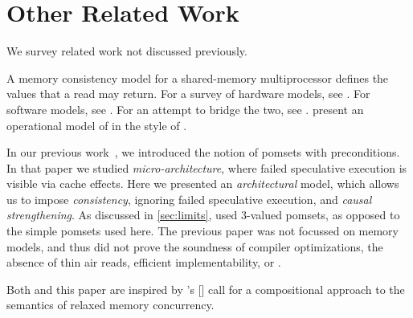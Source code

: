 \section{Other Related Work}\label{sec:related}
We survey related work not discussed previously.

A memory consistency model for a shared-memory multiprocessor defines the
values that a read may return.  For a survey of hardware models, see
\citep{AlglaveThesis}. For software models, see
\citep{DBLP:journals/toplas/Lochbihler13,DBLP:phd/ethos/Batty15}.  For an
attempt to bridge the two, see \citep{DBLP:journals/pacmpl/PodkopaevLV19}.
\citet{DBLP:conf/pldi/PultePKLH19} present an operational model of
\armeight{} in the style of \cite{DBLP:conf/popl/KangHLVD17}.

In our previous work~\cite{2019-sp}, we introduced the notion of pomsets with
preconditions.  In that paper we studied \emph{micro\hyp{}architecture},
where failed speculative execution is visible via cache effects.  Here we
presented an \emph{architectural} model, which allows us to impose
\emph{consistency}, ignoring failed speculative execution, and \emph{causal
  strengthening}.  As discussed in \textsection\ref{sec:limits},
\cite{2019-sp} used 3-valued pomsets, as opposed to the simple pomsets used
here.  The previous paper was not focussed on memory models, and thus did not
prove the soundness of compiler optimizations, the absence of thin air reads,
efficient implementability, or \drfsc{}.

Both \cite{2019-sp} and this paper are inspired by \citeauthor{Batty17}'s
[\citeyear{Batty17}] call for a compositional approach to the semantics of
relaxed memory concurrency.  

